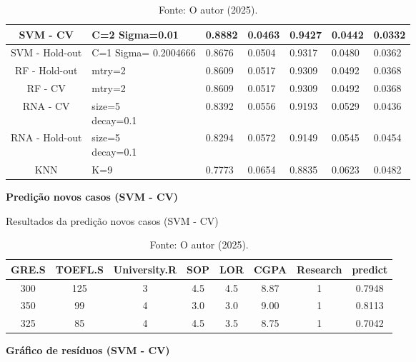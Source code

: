 \begin{table}[H]
\begin{minipage}{\textwidth}
{\begin{tabular}{|c|p{3cm}|p{2cm}|p{2cm}|p{2cm}|p{2cm}|p{2cm}|}
\hline%
\colorbox[HTML]{CAF2C2}{SVM - CV} & C=2 Sigma=0.01 & \colorbox[HTML]{CAF2C2}{0.8882} & \colorbox[HTML]{CAF2C2}{0.0463} & \colorbox[HTML]{CAF2C2}{0.9427} & \colorbox[HTML]{CAF2C2}{0.0442} & \colorbox[HTML]{CAF2C2}{0.0332} \\
\hline
SVM - Hold-out & C=1 Sigma= 0.2004666 & 0.8676 & 0.0504 & 0.9317 & 0.0480 & 0.0362 \\
\hline
RF - Hold-out & mtry=2 & 0.8609 & 0.0517 & 0.9309 & 0.0492 & 0.0368 \\
\hline
RF - CV & mtry=2 & 0.8609 & 0.0517 & 0.9309 & 0.0492 & 0.0368 \\
\hline
RNA - CV & \makecell[l]{size=5\\decay=0.1} & 0.8392 & 0.0556 & 0.9193 & 0.0529 & 0.0436 \\
\hline
RNA - Hold-out & \makecell[l]{size=5\\decay=0.1} & 0.8294 & 0.0572 & 0.9149 & 0.0545 & 0.0454 \\
\hline
KNN & K=9 & 0.7773 & 0.0654 & 0.8835 & 0.0623 & 0.0482 \\
\hline
\end{tabular}
}
\end{minipage}
\caption*{Fonte: O autor (2025).}
\end{table}


\begin{center}
    \textbf{Predição novos casos (SVM - CV)}
\end{center}

\begin{table}[H]
\centering
\caption{Resultados da predição novos casos (SVM - CV)}
\begin{tabular}{|c|c|c|c|c|c|c|c|}
\hline
GRE.S & TOEFL.S & University.R & SOP & LOR & CGPA & Research & predict \\
\hline
300 & 125 & 3 & 4.5 & 4.5 & 8.87 & 1 & 0.7948 \\
\hline
350 & 99 & 4 & 3.0 & 3.0 & 9.00 & 1 & 0.8113 \\
\hline
325 & 85 & 4 & 4.5 & 3.5 & 8.75 & 1 & 0.7042 \\
\hline
\end{tabular}
\caption*{Fonte: O autor (2025).}
\end{table}


\begin{center}
    \textbf{Gráfico de resíduos (SVM - CV)}
\end{center}

